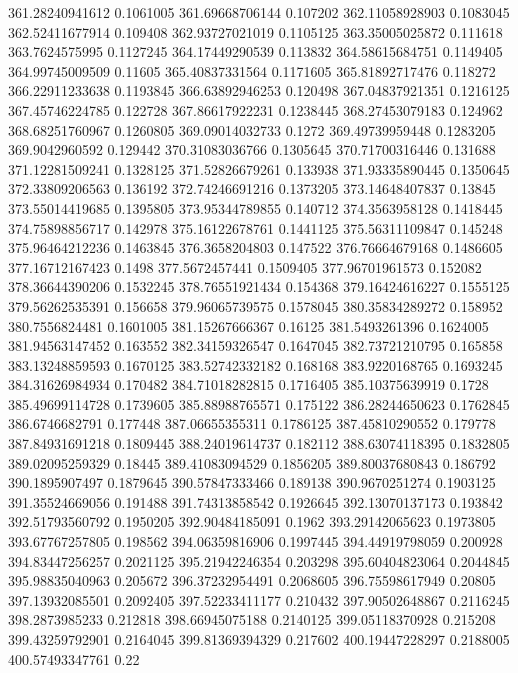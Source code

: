 361.28240941612 0.1061005
361.69668706144 0.107202
362.11058928903 0.1083045
362.52411677914 0.109408
362.93727021019 0.1105125
363.35005025872 0.111618
363.7624575995 0.1127245
364.17449290539 0.113832
364.58615684751 0.1149405
364.99745009509 0.11605
365.40837331564 0.1171605
365.81892717476 0.118272
366.22911233638 0.1193845
366.63892946253 0.120498
367.04837921351 0.1216125
367.45746224785 0.122728
367.86617922231 0.1238445
368.27453079183 0.124962
368.68251760967 0.1260805
369.09014032733 0.1272
369.49739959448 0.1283205
369.9042960592 0.129442
370.31083036766 0.1305645
370.71700316446 0.131688
371.12281509241 0.1328125
371.52826679261 0.133938
371.93335890445 0.1350645
372.33809206563 0.136192
372.74246691216 0.1373205
373.14648407837 0.13845
373.55014419685 0.1395805
373.95344789855 0.140712
374.3563958128 0.1418445
374.75898856717 0.142978
375.16122678761 0.1441125
375.56311109847 0.145248
375.96464212236 0.1463845
376.3658204803 0.147522
376.76664679168 0.1486605
377.16712167423 0.1498
377.5672457441 0.1509405
377.96701961573 0.152082
378.36644390206 0.1532245
378.76551921434 0.154368
379.16424616227 0.1555125
379.56262535391 0.156658
379.96065739575 0.1578045
380.35834289272 0.158952
380.7556824481 0.1601005
381.15267666367 0.16125
381.5493261396 0.1624005
381.94563147452 0.163552
382.34159326547 0.1647045
382.73721210795 0.165858
383.13248859593 0.1670125
383.52742332182 0.168168
383.9220168765 0.1693245
384.31626984934 0.170482
384.71018282815 0.1716405
385.10375639919 0.1728
385.49699114728 0.1739605
385.88988765571 0.175122
386.28244650623 0.1762845
386.6746682791 0.177448
387.06655355311 0.1786125
387.45810290552 0.179778
387.84931691218 0.1809445
388.24019614737 0.182112
388.63074118395 0.1832805
389.02095259329 0.18445
389.41083094529 0.1856205
389.80037680843 0.186792
390.1895907497 0.1879645
390.57847333466 0.189138
390.9670251274 0.1903125
391.35524669056 0.191488
391.74313858542 0.1926645
392.13070137173 0.193842
392.51793560792 0.1950205
392.90484185091 0.1962
393.29142065623 0.1973805
393.67767257805 0.198562
394.06359816906 0.1997445
394.44919798059 0.200928
394.83447256257 0.2021125
395.21942246354 0.203298
395.60404823064 0.2044845
395.98835040963 0.205672
396.37232954491 0.2068605
396.75598617949 0.20805
397.13932085501 0.2092405
397.52233411177 0.210432
397.90502648867 0.2116245
398.2873985233 0.212818
398.66945075188 0.2140125
399.05118370928 0.215208
399.43259792901 0.2164045
399.81369394329 0.217602
400.19447228297 0.2188005
400.57493347761 0.22

